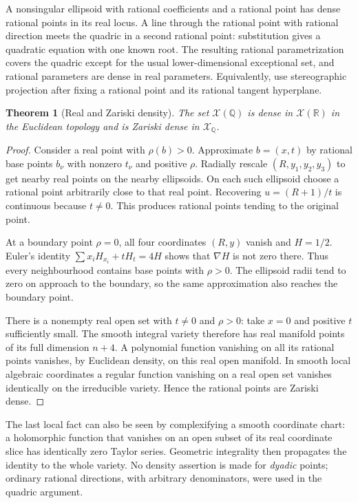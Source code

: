 \documentclass[11pt,a4paper]{article}
\newtheorem{theorem}{Theorem}[section]
\theoremstyle{definition}
\theoremstyle{remark}
\newcommand{\Q}{\mathbb Q}
\newcommand{\R}{\mathbb R}
\newcommand{\variety}{\mathcal X}
\begin{document}
A nonsingular ellipsoid with rational coefficients and a rational point has
dense rational points in its real locus. A line through the rational point
with rational direction meets the quadric in a second rational point:
substitution gives a quadratic equation with one known root. The resulting
rational parametrization covers the quadric except for the usual
lower-dimensional exceptional set, and rational parameters are dense in
real parameters. Equivalently, use stereographic projection after fixing
a rational point and its rational tangent hyperplane.

\begin{theorem}[Real and Zariski density]\label{sdf:thm:density}
The set $\variety(\Q)$ is dense in $\variety(\R)$ in the Euclidean topology
and is Zariski dense in $\variety_\Q$.
\end{theorem}
\begin{proof}
Consider a real point with $\rho(b)>0$. Approximate $b=(x,t)$ by rational
base points $b_\nu$ with nonzero $t_\nu$ and positive $\rho$. Radially
rescale $(R,y_1,y_2,y_3)$ to get nearby real points on the nearby ellipsoids.
On each such ellipsoid choose a rational point arbitrarily close to that
real point. Recovering $u=(R+1)/t$ is continuous because $t\ne0$. This
produces rational points tending to the original point.

At a boundary point $\rho=0$, all four coordinates $(R,y)$ vanish and
$H=1/2$. Euler's identity
$\sum x_iH_{x_i}+tH_t=4H$ shows that $\nabla H$ is not zero there.
Thus every neighbourhood contains base points with $\rho>0$. The ellipsoid
radii tend to zero on approach to the boundary, so the same approximation
also reaches the boundary point.

There is a nonempty real open set with $t\ne0$ and $\rho>0$: take $x=0$
and positive $t$ sufficiently small. The smooth integral variety therefore
has real manifold points of its full dimension $n+4$. A polynomial function
vanishing on all its rational points vanishes, by Euclidean density, on this
real open manifold. In smooth local algebraic coordinates a regular
function vanishing on a real open set vanishes identically on the
irreducible variety. Hence the rational points are Zariski dense.
\end{proof}

The last local fact can also be seen by complexifying a smooth coordinate
chart: a holomorphic function that vanishes on an open subset of its real
coordinate slice has identically zero Taylor series. Geometric integrality
then propagates the identity to the whole variety. No density assertion is
made for \emph{dyadic} points; ordinary rational directions, with arbitrary
denominators, were used in the quadric argument.
\end{document}
